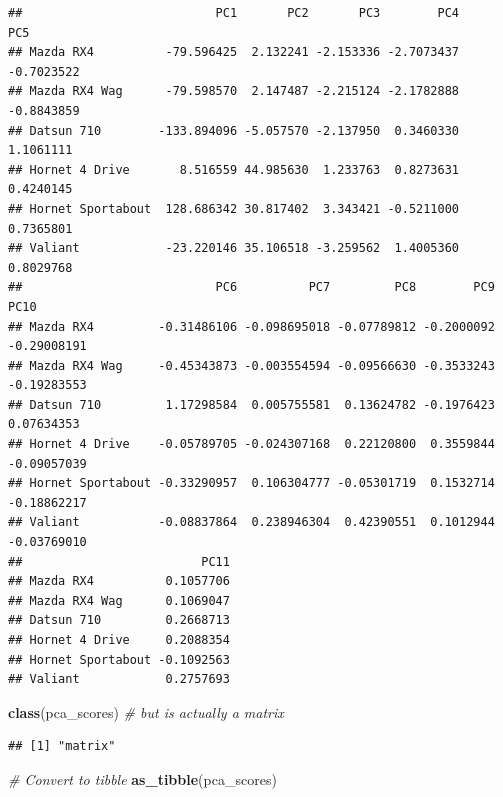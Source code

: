 \documentclass[]{book}
\newenvironment{Shaded}{}{}
\newcommand{\CommentTok}[1]{\textcolor[rgb]{0.38,0.63,0.69}{\textit{#1}}}
\newcommand{\KeywordTok}[1]{\textcolor[rgb]{0.00,0.44,0.13}{\textbf{#1}}}
\newcommand{\NormalTok}[1]{#1}
\newcommand{\OperatorTok}[1]{\textcolor[rgb]{0.40,0.40,0.40}{#1}}
\newcommand{\StringTok}[1]{\textcolor[rgb]{0.25,0.44,0.63}{#1}}
\begin{document}
\begin{Shaded}
\end{Shaded}

\begin{verbatim}
##                           PC1       PC2       PC3        PC4        PC5
## Mazda RX4          -79.596425  2.132241 -2.153336 -2.7073437 -0.7023522
## Mazda RX4 Wag      -79.598570  2.147487 -2.215124 -2.1782888 -0.8843859
## Datsun 710        -133.894096 -5.057570 -2.137950  0.3460330  1.1061111
## Hornet 4 Drive       8.516559 44.985630  1.233763  0.8273631  0.4240145
## Hornet Sportabout  128.686342 30.817402  3.343421 -0.5211000  0.7365801
## Valiant            -23.220146 35.106518 -3.259562  1.4005360  0.8029768
##                           PC6          PC7         PC8        PC9        PC10
## Mazda RX4         -0.31486106 -0.098695018 -0.07789812 -0.2000092 -0.29008191
## Mazda RX4 Wag     -0.45343873 -0.003554594 -0.09566630 -0.3533243 -0.19283553
## Datsun 710         1.17298584  0.005755581  0.13624782 -0.1976423  0.07634353
## Hornet 4 Drive    -0.05789705 -0.024307168  0.22120800  0.3559844 -0.09057039
## Hornet Sportabout -0.33290957  0.106304777 -0.05301719  0.1532714 -0.18862217
## Valiant           -0.08837864  0.238946304  0.42390551  0.1012944 -0.03769010
##                         PC11
## Mazda RX4          0.1057706
## Mazda RX4 Wag      0.1069047
## Datsun 710         0.2668713
## Hornet 4 Drive     0.2088354
## Hornet Sportabout -0.1092563
## Valiant            0.2757693
\end{verbatim}

\begin{Shaded}
\begin{Highlighting}[]
\KeywordTok{class}\NormalTok{(pca_scores) }\CommentTok{# but is actually a matrix}
\end{Highlighting}
\end{Shaded}

\begin{verbatim}
## [1] "matrix"
\end{verbatim}

\begin{Shaded}
\begin{Highlighting}[]
\CommentTok{# Convert to tibble}
\KeywordTok{as_tibble}\NormalTok{(pca_scores)}
\end{Highlighting}
\end{Shaded}
\end{document}
